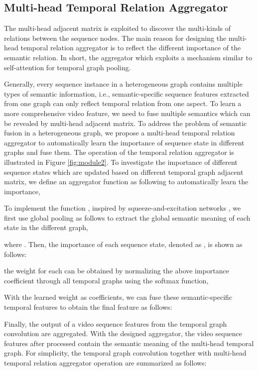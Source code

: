 \documentclass[conference,compsoc]{IEEEtran}
\begin{document}
\subsection{Multi-head Temporal Relation Aggregator}
    The multi-head adjacent matrix is exploited to discover the multi-kinds of relations between the sequence nodes. The main reason for designing the multi-head temporal relation aggregator is to reflect the different importance of the semantic relation. In short, the aggregator which exploits a mechanism similar to self-attention for temporal graph pooling. 

    Generally, every sequence instance in a heterogeneous graph contains multiple types of semantic information, i.e., semantic-specific sequence features extracted from one graph can only reflect temporal relation from one aspect. To learn a more comprehensive video feature, we need to fuse multiple semantics which can be revealed by multi-head adjacent matrix. To address the problem of semantic fusion in a heterogeneous graph, we propose a multi-head temporal relation aggregator to automatically learn the importance of sequence state in different graphs and fuse them. The operation of the temporal relation aggregator is illustrated in Figure \ref{fig:module2}. 
To investigate the importance of different sequence states  which are updated based on different temporal graph adjacent matrix, we define an aggregator function as following to automatically learn the importance,
    

    To implement the function , inspired by squeeze-and-excitation networks \cite{hu2018squeeze-and-excitation}, we first use global pooling as follows to extract the global semantic meaning of each state in the different graph,
    
    where . Then, the importance of each sequence state, denoted as , is shown as follows:
    
     the weight for each  can be obtained by normalizing the above importance coefficient  through all temporal graphs using the softmax function,
     

     With the learned weight as coefficients, we can fuse these semantic-specific temporal features  to obtain the final feature  as follows:
     
     
     Finally, the output of a video sequence features from the temporal graph convolution are aggregated. With the designed aggregator, the video sequence features after processed contain the semantic meaning of the multi-head temporal graph. For simplicity, the temporal graph convolution together with multi-head temporal relation aggregator operation are summarized as follows:
    
\end{document}
